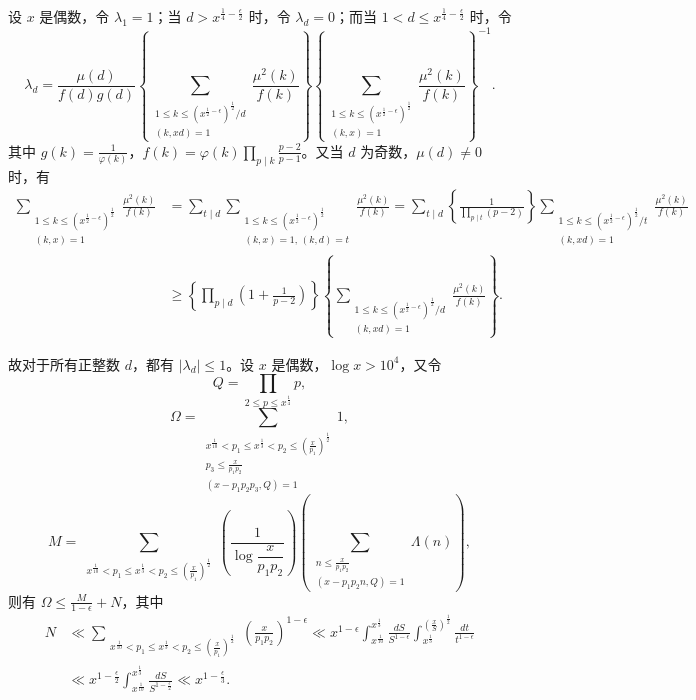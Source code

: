 设 $x$ 是偶数，令 $\lambda_1=1$；当 $d>x^{\frac14-\frac{\epsilon}{2}}$ 时，令 $\lambda_d=0$；而当 $1<d\leqslant x^{\frac14-\frac{\epsilon}{2}}$ 时，令
\[
\lambda_d=\frac{\mu(d)}{f(d)g(d)}
\left\{
\sum_{\substack{1\leqslant k\leqslant(x^{\frac12-\epsilon})^{\frac12}/d\\(k,xd)=1}}
\frac{\mu^2(k)}{f(k)}
\right\}
\left\{
\sum_{\substack{1\leqslant k\leqslant(x^{\frac12-\epsilon})^{\frac12}\\(k,x)=1}}
\frac{\mu^2(k)}{f(k)}
\right\}^{-1}.
\]
其中 $\displaystyle g(k)=\frac{1}{\varphi(k)}$，$\displaystyle f(k)=\varphi(k)\prod_{p\mid k}\frac{p-2}{p-1}$。又当 $d$ 为奇数，$\mu(d)\neq0$ 时，有
\begin{align*}
\sum_{\substack{1\leqslant k\leqslant(x^{\frac12-\epsilon})^{\frac12}\\(k,x)=1}}
\frac{\mu^2(k)}{f(k)}
&=\sum_{t\mid d}\sum_{\substack{1\leqslant k\leqslant(x^{\frac12-\epsilon})^{\frac12}\\(k,x)=1,\,(k,d)=t}}
\frac{\mu^2(k)}{f(k)}
=\sum_{t\mid d}\left\{\frac{1}{\prod_{p\mid t}(p-2)}\right\}
\sum_{\substack{1\leqslant k\leqslant(x^{\frac12-\epsilon})^{\frac12}/t\\(k,xd)=1}}
\frac{\mu^2(k)}{f(k)}\\
&\geqslant\left\{\prod_{p\mid d}\left(1+\frac{1}{p-2}\right)\right\}
\left\{
\sum_{\substack{1\leqslant k\leqslant(x^{\frac12-\epsilon})^{\frac12}/d\\(k,xd)=1}}
\frac{\mu^2(k)}{f(k)}
\right\}.
\end{align*}

故对于所有正整数 $d$，都有 $|\lambda_d|\leqslant1$。设 $x$ 是偶数，$\log x>10^4$，又令
\[
Q=\prod_{2\leqslant p\leqslant x^{\frac14}}p,
\]
\[
\Omega=\sum_{\substack{x^{\frac1{10}}<p_1\leqslant x^{\frac13}<p_2\leqslant(\frac{x}{p_1})^{\frac12}\\p_3\leqslant\frac{x}{p_1p_2}\\(x-p_1p_2p_3,Q)=1}}1,
\]
\[
M=\sum_{\substack{x^{\frac1{10}}<p_1\leqslant x^{\frac13}<p_2\leqslant(\frac{x}{p_1})^{\frac12}}}
\left(\frac{1}{\log\dfrac{x}{p_1p_2}}\right)
\left(\sum_{\substack{n\leqslant\frac{x}{p_1p_2}\\(x-p_1p_2n,Q)=1}}\Lambda(n)\right),
\]
则有 $\displaystyle \Omega\leqslant\frac{M}{1-\epsilon}+N$，其中
\begin{align*}
N&\ll\sum_{\substack{x^{\frac1{10}}<p_1\leqslant x^{\frac13}<p_2\leqslant(\frac{x}{p_1})^{\frac12}}}
\left(\frac{x}{p_1p_2}\right)^{1-\epsilon}
\ll x^{1-\epsilon}\int_{x^{\frac1{10}}}^{x^{\frac13}}\frac{dS}{S^{1-\epsilon}}
\int_{x^{\frac13}}^{(\frac{x}{S})^{\frac12}}\frac{dt}{t^{1-\epsilon}}\\
&\ll x^{1-\frac{\epsilon}{2}}\int_{x^{\frac1{10}}}^{x^{\frac13}}\frac{dS}{S^{1-\frac{\epsilon}{2}}}
\ll x^{1-\frac{\epsilon}{3}}.
\end{align*}

